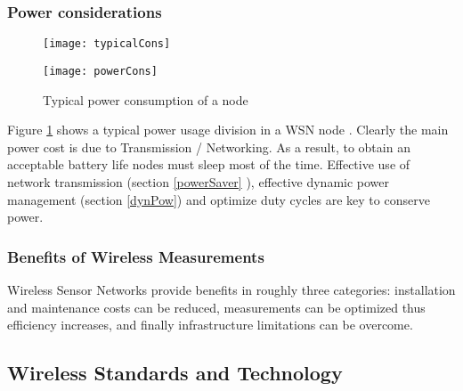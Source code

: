 \subsubsection{Power considerations}
\begin{figure}[htbp]
\centering
\texttt{[image: typicalCons]}
\end{figure} 
\begin{figure}[htbp]
\centering
\texttt{[image: powerCons]}
\caption{Typical power consumption of a node}
\label{fig:typicalCons2}
\end{figure}
\noindent Figure \ref{fig:typicalCons2} shows a typical power usage division in a WSN node \citep{NIWSN}. Clearly the main power cost is due to Transmission / Networking. As a result, to obtain an acceptable battery life nodes must sleep most of the time. Effective use of network transmission (section \ref{powerSaver} ), effective dynamic power management (section \ref{dynPow}) and optimize duty cycles are key to conserve power.\\
\subsubsection{Benefits of Wireless Measurements}
Wireless Sensor Networks provide benefits in roughly three categories: installation and maintenance costs can be reduced, measurements can be optimized thus efficiency increases, and finally infrastructure limitations can be overcome.
\subsection{Wireless Standards and Technology}
